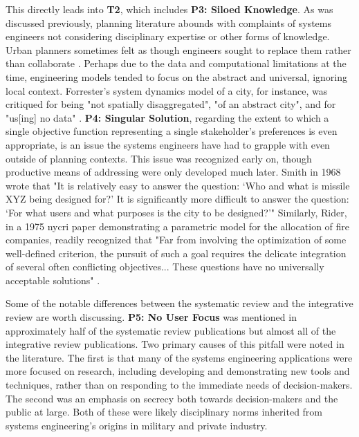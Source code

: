 This directly leads into \textbf{T2}, which includes \textbf{P3: Siloed Knowledge}. As was discussed previously, planning literature abounds with complaints of systems engineers not considering disciplinary expertise or other forms of knowledge. Urban planners sometimes felt as though engineers sought to replace them rather than collaborate \cite{lightWarfareWelfareDefense2005}. Perhaps due to the data and computational limitations at the time, engineering models tended to focus on the abstract and universal, ignoring local context. Forrester's system dynamics model of a city, for instance, was critiqued for being "not spatially disaggregated", "of an abstract city", and for "us[ing] no data" \cite{leejrRequiemLargeScaleModels1973}. \textbf{P4: Singular Solution}, regarding the extent to which a single objective function representing a single stakeholder's preferences is even appropriate, is an issue the systems engineers have had to grapple with even outside of planning contexts. This issue was recognized early on, though productive means of addressing were only developed much later. Smith in 1968 wrote that "It is relatively easy to answer the question: `Who and what is missile XYZ being designed for?' It is significantly more difficult to answer the question: `For what users and what purposes is the city to be designed?'" \cite{smithSystemsApproachUrban1968} Similarly, Rider, in a 1975 \ac{nycri} paper demonstrating a parametric model for the allocation of fire companies, readily recognized that "Far from involving the optimization of some well-defined criterion, the pursuit of such a goal requires the delicate integration of several often conflicting objectives... These questions have no universally acceptable solutions" \cite{riderParametricModelAllocation1975}.

Some of the notable differences between the systematic review and the integrative review are worth discussing. \textbf{P5: No User Focus} was mentioned in approximately half of the systematic review publications but almost all of the integrative review publications. Two primary causes of this pitfall were noted in the literature. The first is that many of the systems engineering applications were more focused on research, including developing and demonstrating new tools and techniques, rather than on responding to the immediate needs of decision-makers. The second was an emphasis on secrecy both towards decision-makers and the public at large. Both of these were likely disciplinary norms inherited from systems engineering's origins in military and private industry.

